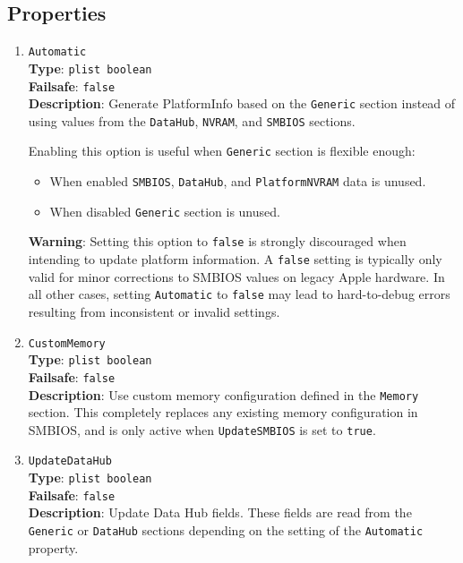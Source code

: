 \documentclass[]{article}
\providecommand{\tightlist}{%
  \setlength{\itemsep}{0pt}\setlength{\parskip}{0pt}}
\begin{document}
\subsection{Properties}\label{platforminfoprops}

\begin{enumerate}
\item
  \texttt{Automatic}\\
  \textbf{Type}: \texttt{plist\ boolean}\\
  \textbf{Failsafe}: \texttt{false}\\
  \textbf{Description}: Generate PlatformInfo based on the \texttt{Generic}
  section instead of using values from the \texttt{DataHub}, \texttt{NVRAM},
  and \texttt{SMBIOS} sections.

  Enabling this option is useful when \texttt{Generic} section is flexible
  enough:
  \begin{itemize}
  \tightlist
  \item When enabled \texttt{SMBIOS}, \texttt{DataHub}, and
  \texttt{PlatformNVRAM} data is unused.
  \item When disabled \texttt{Generic} section is unused.
  \end{itemize}

  \textbf{Warning}: Setting this option to \texttt{false} is strongly discouraged when
  intending to update platform information. A \texttt{false} setting is typically only
  valid for minor corrections to SMBIOS values on legacy Apple hardware. In all other
  cases, setting \texttt{Automatic} to \texttt{false} may lead to hard-to-debug errors
  resulting from inconsistent or invalid settings.

\item
  \texttt{CustomMemory}\\
  \textbf{Type}: \texttt{plist\ boolean}\\
  \textbf{Failsafe}: \texttt{false}\\
  \textbf{Description}: Use custom memory configuration defined in the
  \texttt{Memory} section. This completely replaces any existing memory
  configuration in SMBIOS, and is only active when \texttt{UpdateSMBIOS}
  is set to \texttt{true}.

\item
  \texttt{UpdateDataHub}\\
  \textbf{Type}: \texttt{plist\ boolean}\\
  \textbf{Failsafe}: \texttt{false}\\
  \textbf{Description}: Update Data Hub fields. These fields are read
  from the \texttt{Generic} or \texttt{DataHub} sections depending on
  the setting of the \texttt{Automatic} property.


\end{enumerate}
\end{document}
